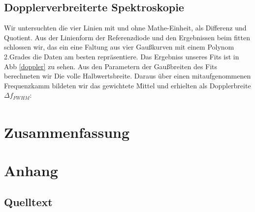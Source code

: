 \documentclass[12pt]{article}
\begin{document}
\subsection{Dopplerverbreiterte Spektroskopie}
Wir untersuchten die vier Linien mit und ohne Mathe-Einheit, als Differenz und Quotient. Aus der Linienform der Referenzdiode und den Ergebnissen beim fitten schlossen wir, das ein eine Faltung aus vier Gaußkurven mit einem Polynom 2.Grades die Daten am besten repräsentiere. Das Ergebniss unseres Fits ist in Abb \ref{doppler} zu sehen. Aus den Parametern der Gaußbreiten des Fits berechneten wir Die volle Halbwertsbreite. Daraus über einen mitaufgenommenen Frequenzkamm  bildeten wir das gewichtete Ḿittel und erhielten als Dopplerbreite $\Delta f_{FWHM}$:
\begin{align*}
 
\end{align*}
\section{Zusammenfassung}
\section{Anhang}

\subsection{Quelltext}

%
\end{document}
